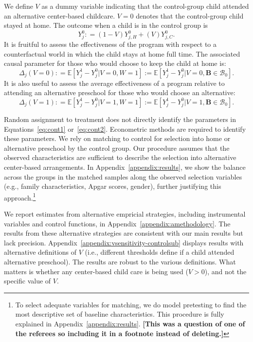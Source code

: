 We define $V$ as a dummy variable indicating that the control-group child attended an alternative center-based childcare. $V=0$ denotes that the control-group child stayed at home. The outcome when a child is in the control group is
\begin{equation}
Y_{j}^0 : = \left( 1 - V \right) Y_{j,H}^0 + \left( V \right) Y_{j,C}^0. \label{eq:meandiff}
\end{equation}
\noindent It is fruitful to assess the effectiveness of the program with respect to a counterfactual world in which the child stays at home full time. The associated causal parameter for those who would choose to keep the child at home is:
\begin{equation}\label{eq:cont1}
\Delta_j \left(V = 0 \right) : =   \mathbb{E} \left[ Y_{j}^1 -  Y_{j}^0 | V = 0, W = 1 \right] := \mathbb{E} \left[Y_{j}^1 -  Y_{j}^0 | V = 0, \bm{B} \in \mathcal{B}_0 \right].
\end{equation}
It is also useful to assess the average effectiveness of a program relative to attending an alternative preschool for those who would choose an alternative:
\begin{equation}\label{eq:cont2}
\Delta_j \left( V =1 \right) : =   \mathbb{E} \left[ Y_{j}^1 -  Y_{j}^0 | V = 1, W = 1 \right] := \mathbb{E} \left[ Y_{j}^1 -  Y_{j}^0 | V = 1, \bm{B} \in \mathcal{B}_0 \right].
\end{equation}

Random assignment to treatment does not directly identify the parameters in Equations~\eqref{eq:cont1} or~\eqref{eq:cont2}. Econometric methods are required to identify these parameters. We rely on matching to control for selection into home or alternative preschool by the control group. Our procedure assumes that the observed characteristics are sufficient to describe the selection into alternative center-based arrangements. In Appendix~\ref{appendix:results}, we show the balance across the groups in the matched samples along the observed selection variables (e.g., family characteristics, Apgar scores, gender), further justifying this approach.\footnote{To select adequate variables for matching, we do model pretesting to find the most descriptive set of baseline characteristics. This procedure is fully explained in Appendix~\ref{appendix:results}. \textbf{[This was a question of one of the referees so including it in a footnote instead of deleting.]}}

We report estimates from alternative empricial strategies, including instrumental variables and control functions, in Appendix~\ref{appendix:amethodology}. The results from these alternative strategies are consistent with our main results but lack precision. Appendix~\ref{appendix:vsensitivity-controlsub} displays results with alternative definitions of $V$ (i.e., different thresholds define if a child attended alternative preschool). The results are robust to the various definitions. What matters is whether any center-based child care is being used ($V>0$), and not the specific value of $V$. 

